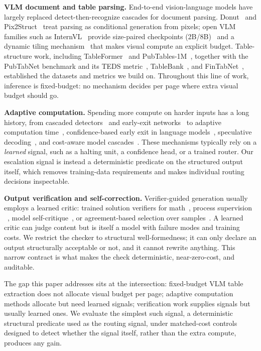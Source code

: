\documentclass[conference]{IEEEtran}
\begin{document}
\textbf{VLM document and table parsing.} End-to-end vision-language
models have largely replaced detect-then-recognize cascades for document
parsing. Donut~\cite{kim2022donut} and Pix2Struct~\cite{lee2023pix2struct}
treat parsing as conditional generation from pixels; open VLM families
such as InternVL~\cite{chen2024internvl} provide size-paired checkpoints
(2B/8B)~\cite{opengvlab2024internvl2} and a dynamic tiling mechanism~\cite{chen2024internvl15} that
makes visual compute an explicit budget. Table-structure work, including
TableFormer~\cite{nassar2022tableformer} and
PubTables-1M~\cite{smock2022pubtables}, together with the PubTabNet
benchmark and its TEDS metric~\cite{zhong2020teds},
TableBank~\cite{li2020tablebank}, and
FinTabNet~\cite{zheng2021fintabnet}, established the datasets and metrics
we build on. Throughout this line of work, inference is fixed-budget: no
mechanism decides per page where extra visual budget should go.

\textbf{Adaptive computation.} Spending more compute on harder inputs has
a long history, from cascaded detectors~\cite{viola2001rapid} and
early-exit networks~\cite{teerapittayanon2016branchynet} to adaptive
computation time~\cite{graves2016act}, confidence-based early exit in
language models~\cite{schuster2022calm}, speculative
decoding~\cite{leviathan2023speculative}, and cost-aware model
cascades~\cite{chen2023frugalgpt}. These mechanisms typically rely on a
\emph{learned} signal, such as a halting unit, a confidence head, or a trained
router. Our escalation signal is instead a deterministic predicate on the
structured output itself, which removes training-data requirements and
makes individual routing decisions inspectable.

\textbf{Output verification and self-correction.} Verifier-guided
generation usually employs a learned critic: trained solution verifiers
for math~\cite{cobbe2021verifiers}, process supervision
~\cite{lightman2024verify}, model self-critique~\cite{madaan2023selfrefine},
or agreement-based selection over samples~\cite{wang2023selfconsistency}.
A learned critic can judge content but is itself a model with failure
modes and training costs. We restrict the checker to structural
well-formedness; it can only declare an output structurally acceptable
or not, and it cannot rewrite anything. This narrow contract is what
makes the check deterministic, near-zero-cost, and auditable.

The gap this paper addresses sits at the intersection: fixed-budget VLM
table extraction does not allocate visual budget per page; adaptive
computation methods allocate but need learned signals; verification work
supplies signals but usually learned ones. We evaluate the simplest
such signal, a deterministic structural predicate used as
the routing signal, under matched-cost controls designed to detect
whether the signal itself, rather than the extra compute, produces any
gain.
\end{document}
